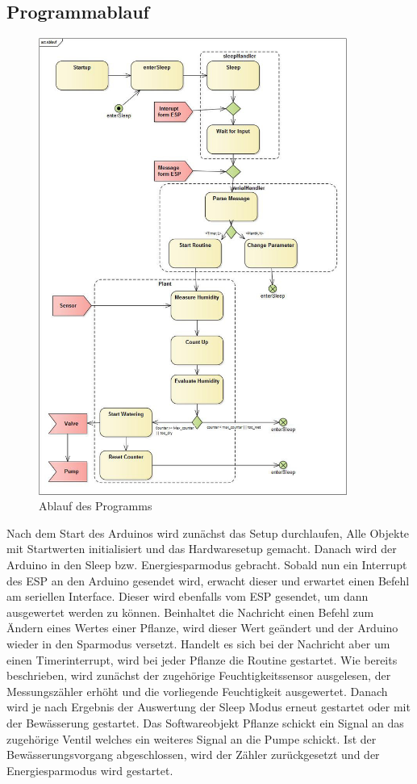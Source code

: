 \newpage
\subsection{Programmablauf}
\begin{figure}
    \centering
    \includegraphics[width=0.9\textwidth]{marcel/ablauf}
    \caption{Ablauf des Programms}
\end{figure}
Nach dem Start des Arduinos wird zunächst das Setup durchlaufen, Alle Objekte mit
Startwerten initialisiert und das Hardwaresetup gemacht. Danach wird der Arduino
in den Sleep bzw. Energiesparmodus gebracht.  Sobald nun ein Interrupt des ESP an
den Arduino gesendet wird, erwacht dieser und erwartet einen Befehl am seriellen
Interface. Dieser wird ebenfalls vom ESP gesendet, um dann ausgewertet werden zu
können. Beinhaltet die Nachricht einen Befehl zum Ändern eines Wertes einer Pflanze,
wird dieser Wert geändert und der Arduino wieder in den Sparmodus versetzt. Handelt
es sich bei der Nachricht aber um einen Timerinterrupt, wird bei jeder Pflanze die
Routine gestartet. Wie bereits beschrieben, wird zunächst der zugehörige
Feuchtigkeitssensor ausgelesen, der Messungszähler erhöht und die vorliegende
Feuchtigkeit ausgewertet. Danach wird je nach Ergebnis der Auswertung der Sleep
Modus erneut gestartet oder mit der Bewässerung gestartet. Das Softwareobjekt
Pflanze schickt ein Signal an das zugehörige Ventil welches ein weiteres Signal
an die Pumpe schickt. Ist der Bewässerungsvorgang abgeschlossen, wird der Zähler
zurückgesetzt und der Energiesparmodus wird gestartet. 
